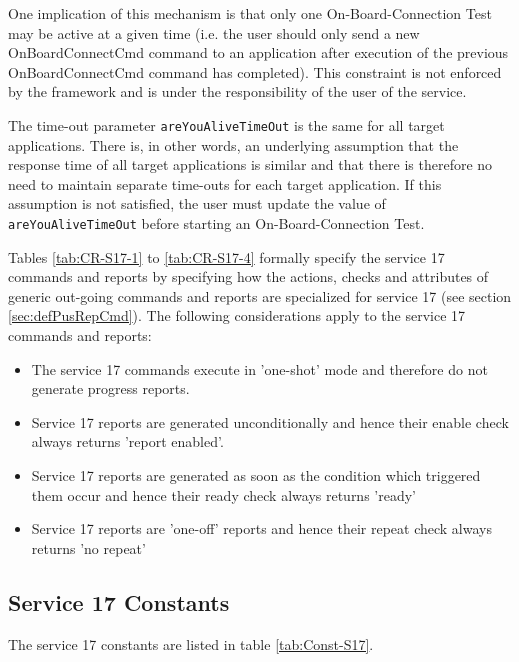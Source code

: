 \documentclass{pnp_article}
\begin{document}
One implication of this mechanism is that only one On-Board-Connection Test may be active at a given time (i.e. the user should only send a new OnBoardConnectCmd command to an application after execution of the previous OnBoardConnectCmd command has completed). This constraint is not enforced by the framework and is under the responsibility of the user of the service.

The time-out parameter \texttt{areYouAliveTimeOut} is the same for all target applications. There is, in other words, an underlying assumption that the response time of all target applications is similar and that there is therefore no need to maintain separate time-outs for each target application. If this assumption is not satisfied, the user must update the value of \texttt{areYouAliveTimeOut} before starting an On-Board-Connection Test.

Tables \ref{tab:CR-S17-1} to \ref{tab:CR-S17-4} formally specify the service 17 commands and reports by specifying how the actions, checks and attributes of generic out-going commands and reports are specialized for service 17 (see section \ref{sec:defPusRepCmd}). The following considerations apply to the service 17 commands and reports:

\begin{itemize}
\item The service 17 commands execute in 'one-shot' mode and therefore do not generate progress reports.
\item Service 17 reports are generated unconditionally and hence their enable check always returns 'report enabled'.
\item Service 17 reports are generated as soon as the condition which triggered them occur and hence their ready check always returns 'ready'
\item Service 17 reports are 'one-off' reports and hence their repeat check always returns 'no repeat'
\end{itemize}

\newpage
{}

\newpage
{}



\newpage
\subsection{Service 17 Constants}\label{sec:serv17Const}
The service 17 constants are listed in table \ref{tab:Const-S17}. 
\end{document}
